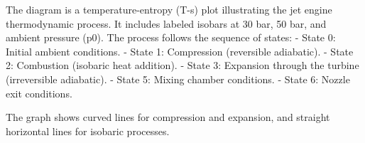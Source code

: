 The diagram is a temperature-entropy (T-s) plot illustrating the jet engine thermodynamic process. It includes labeled isobars at 30 bar, 50 bar, and ambient pressure (p0). The process follows the sequence of states:  
- State 0: Initial ambient conditions.  
- State 1: Compression (reversible adiabatic).  
- State 2: Combustion (isobaric heat addition).  
- State 3: Expansion through the turbine (irreversible adiabatic).  
- State 5: Mixing chamber conditions.  
- State 6: Nozzle exit conditions.  

The graph shows curved lines for compression and expansion, and straight horizontal lines for isobaric processes.